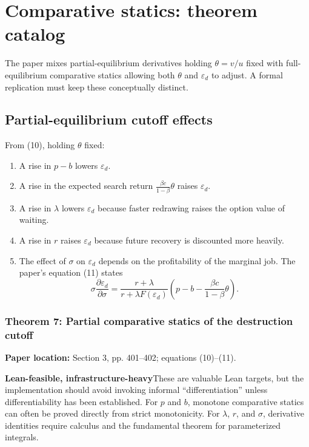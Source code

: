 \documentclass[11pt]{article}
\newcommand{\leaninfra}{\textcolor{darkamber}{\textbf{Lean-feasible, infrastructure-heavy}}}
\newcommand{\papersec}[1]{\textbf{Paper location:} #1}
\newcommand{\statusbox}[2]{\colorbox{#1}{\parbox{0.94\linewidth}{#2}}}
\newcommand{\epsd}{\varepsilon_d}
\begin{document}
\section{Comparative statics: theorem catalog}

The paper mixes partial-equilibrium derivatives holding $\theta=v/u$ fixed with full-equilibrium comparative statics allowing both $\theta$ and $\epsd$ to adjust. A formal replication must keep these conceptually distinct.

\subsection{Partial-equilibrium cutoff effects}
From (10), holding $\theta$ fixed:

\begin{enumerate}
\item A rise in $p-b$ lowers $\epsd$.
\item A rise in the expected search return $\frac{\beta c}{1-\beta}\theta$ raises $\epsd$.
\item A rise in $\lambda$ lowers $\epsd$ because faster redrawing raises the option value of waiting.
\item A rise in $r$ raises $\epsd$ because future recovery is discounted more heavily.
\item The effect of $\sigma$ on $\epsd$ depends on the profitability of the marginal job. The paper's equation (11) states
\begin{equation}
\sigma\frac{\partial\epsd}{\partial\sigma}
=\frac{r+\lambda}{r+\lambda F(\epsd)}
\left(p-b-\frac{\beta c}{1-\beta}\theta\right). \tag{11}
\end{equation}
\end{enumerate}

\subsubsection*{Theorem 7: Partial comparative statics of the destruction cutoff}
\papersec{Section 3, pp. 401--402; equations (10)--(11).}

\statusbox{softamber}{\leaninfra\quad These are valuable Lean targets, but the implementation should avoid invoking informal ``differentiation'' unless differentiability has been established. For $p$ and $b$, monotone comparative statics can often be proved directly from strict monotonicity. For $\lambda$, $r$, and $\sigma$, derivative identities require calculus and the fundamental theorem for parameterized integrals.}
\end{document}
